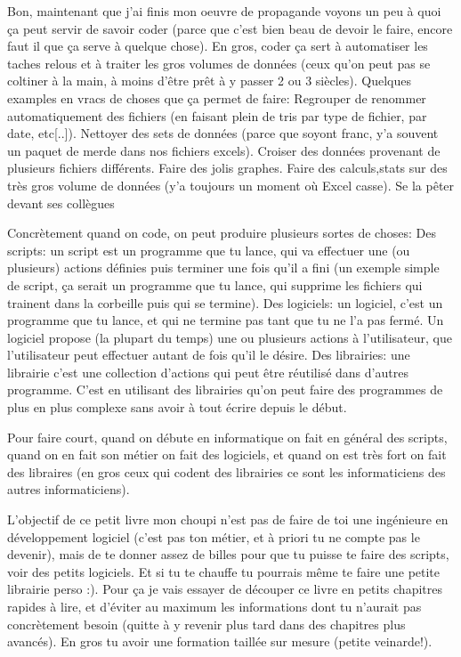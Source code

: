 \documentclass[a4paper, 11pt, oneside, draft]{book}
\begin{document}
Bon, maintenant que j'ai finis mon oeuvre de propagande voyons un peu \`a quoi \c ca peut servir de savoir coder
(parce que c'est bien beau de devoir le faire, encore faut il que \c ca serve \`a quelque chose).
En gros, coder \c ca sert \`a automatiser les taches relous et \`a traiter les gros volumes de donn\'ees (ceux qu'on
peut pas se coltiner \`a la main, \`a moins d'\^etre pr\^et \`a y passer 2 ou 3 si\`ecles).
Quelques examples en vracs de choses que \c ca permet de faire:
Regrouper de renommer automatiquement des fichiers (en faisant plein de tris par type de fichier, par date, etc[..]).
Nettoyer des sets de donn\'ees (parce que soyont franc, y'a souvent un paquet de merde dans nos fichiers excels).
Croiser des donn\'ees provenant de plusieurs fichiers diff\'erents.
Faire des jolis graphes.
Faire des calculs,stats sur des tr\`es gros volume de donn\'ees (y'a toujours un moment o\`u Excel casse).
Se la p\^eter devant ses coll\`egues


Concr\`etement quand on code, on peut produire plusieurs sortes de choses:
Des scripts: un script est un programme que tu lance, qui va effectuer une (ou plusieurs) actions d\'efinies puis terminer
une fois qu'il a fini (un exemple simple de script, \c ca serait un programme que tu lance, qui supprime les fichiers qui trainent
dans la corbeille puis qui se termine).
Des logiciels: un logiciel, c'est un programme que tu lance, et qui ne termine pas tant que tu ne l'a pas ferm\'e. Un logiciel
propose (la plupart du temps) une ou plusieurs actions \`a l'utilisateur, que l'utilisateur peut effectuer autant de fois qu'il le
d\'esire.
Des librairies: une librairie c'est une collection d'actions qui peut \^etre r\'eutilis\'e dans d'autres programme. C'est en
utilisant des librairies qu'on peut faire des programmes de plus en plus complexe sans avoir \`a tout \'ecrire depuis le d\'ebut.

Pour faire court, quand on d\'ebute en informatique on fait en g\'en\'eral des scripts, quand on en fait son m\'etier on fait des logiciels,
et quand on est tr\`es fort on fait des libraires (en gros ceux qui codent des librairies ce sont les informaticiens des autres
informaticiens).

L'objectif de ce petit livre mon choupi n'est pas de faire de toi une ing\'enieure en d\'eveloppement logiciel (c'est pas ton m\'etier, et
\`a priori tu ne compte pas le devenir), mais de te donner assez de billes pour que tu puisse te faire des scripts, voir des petits
logiciels. Et si tu te chauffe tu pourrais m\^eme te faire une petite librairie perso :).
Pour \c ca je vais essayer de d\'ecouper ce livre en petits chapitres rapides \`a lire, et d'\'eviter au maximum les informations dont tu
n'aurait pas concr\`etement besoin (quitte \`a y revenir plus tard dans des chapitres plus avanc\'es). En gros tu avoir une formation
taill\'ee sur mesure (petite veinarde!).
\end{document}
